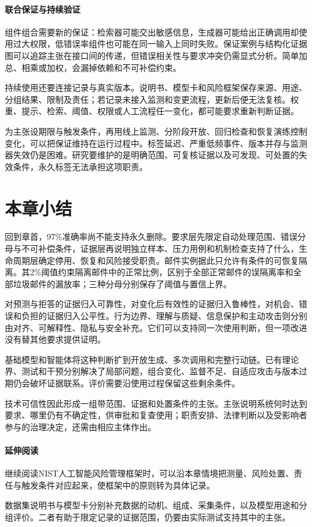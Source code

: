\paragraph{联合保证与持续验证}

组件组合需要新的保证：检索器可能交出敏感信息，生成器可能给出正确调用却使用过大权限，低错误率组件也可能在同一输入上同时失败。保证案例与结构化证据图可以追踪主张在接口间的传递，但错误相关性与要求冲突仍需显式分析。简单加总、相乘或加权，会漏掉依赖和不可补偿约束。

持续使用还要连接记录与真实版本。说明书、模型卡和风险框架保存来源、用途、分组结果、限制及责任；若记录未接入监测和变更流程，更新后便无法复核。权重、提示、检索、阈值、权限或人工流程任一变化，都可能要求重新判断证据。

为主张设期限与触发条件，再用线上监测、分阶段开放、回归检查和恢复演练控制变化，可以把保证维持在运行过程中。标签延迟、严重低频事件、版本并存与监测器失效仍是困难。研究要维护的是明确范围、可复核证据以及可发现、可处置的失效条件，永久标签无法承担这项职责。

\section{本章小结}
\label{sec:trust-foundations-summary}

回到章首，97\%准确率尚不能支持永久删除。要求层先限定自动处理范围、错误分母与不可补偿条件，证据层再说明独立样本、压力用例和机制检查支持了什么，生命周期层确定停用、恢复和风险接受职责。邮件实例据此只允许有条件的可恢复隔离。其2\%阈值约束隔离邮件中的正常比例，区别于全部正常邮件的误隔离率和全部垃圾邮件的漏放率；三种分母分别保存了阈值与置信上界。

对预测与拒答的证据归入可靠性，对变化后有效性的证据归入鲁棒性，对机会、错误和负担的证据归入公平性。行为边界、理解与质疑、信息保护和主动攻击则分别由对齐、可解释性、隐私与安全补充。它们可以支持同一次使用判断，但一项改进没有替其他要求提供证明。

基础模型和智能体将这种判断扩到开放生成、多次调用和完整行动链。已有理论界、测试和干预分别解决了局部问题，组合变化、监督不足、自适应攻击与版本过期仍会破坏证据联系。评价需要沿使用过程保留这些剩余条件。

技术可信性因此形成一组带范围、证据和处置条件的主张。主张说明系统何时达到要求、哪里仍有不确定性，供审批和复查使用；职责安排、法律判断以及受影响者参与的治理决定，还需由相应主体作出。

\paragraph{延伸阅读}

继续阅读NIST人工智能风险管理框架时，可以沿本章情境把测量、风险处置、责任与触发条件对应起来，使框架中的原则转为具体记录。

数据集说明书与模型卡分别补充数据的动机、组成、采集条件，以及模型用途和分组评价。二者有助于限定记录的证据范围，仍要由实际测试支持其中的主张。
